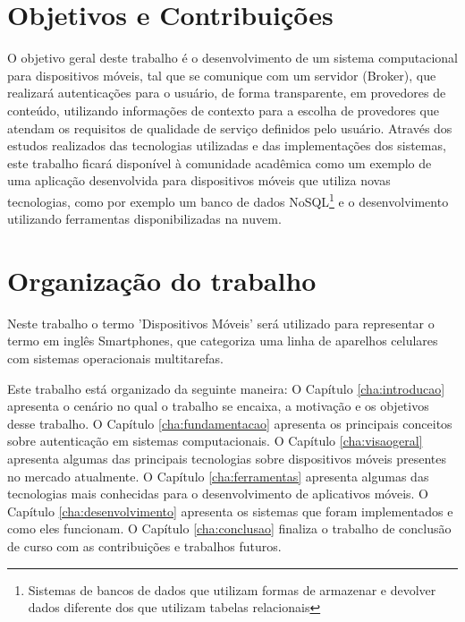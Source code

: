 \section{Objetivos e Contribuições}
O objetivo geral deste trabalho é o desenvolvimento de um sistema computacional para dispositivos móveis, tal que se comunique com um servidor (Broker), que realizará autenticações para o usuário, de forma transparente, em provedores de conteúdo, utilizando informações de contexto para a escolha de provedores que atendam os requisitos de qualidade de serviço definidos pelo usuário.
Através dos estudos realizados das tecnologias utilizadas e das implementações dos sistemas, este trabalho ficará disponível à comunidade acadêmica como um exemplo de uma aplicação desenvolvida para dispositivos móveis que utiliza novas tecnologias, como por exemplo um banco de dados NoSQL\footnote{Sistemas de bancos de dados que utilizam formas de armazenar e devolver dados diferente dos que utilizam tabelas relacionais} e o desenvolvimento utilizando ferramentas disponibilizadas na nuvem.

\section{Organização do trabalho}
Neste trabalho o termo 'Dispositivos Móveis' será utilizado para representar o termo em inglês Smartphones, que categoriza uma linha de aparelhos celulares com sistemas operacionais multitarefas.

Este trabalho está organizado da seguinte maneira: O Capítulo \ref{cha:introducao} apresenta o cenário no qual o trabalho se encaixa, a motivação e os objetivos desse trabalho. O Capítulo \ref{cha:fundamentacao} apresenta os principais conceitos sobre autenticação em sistemas computacionais. O Capítulo \ref{cha:visaogeral} apresenta algumas das principais tecnologias sobre dispositivos móveis presentes no mercado atualmente. O Capítulo \ref{cha:ferramentas} apresenta algumas das tecnologias mais conhecidas para o desenvolvimento de aplicativos móveis. O Capítulo \ref{cha:desenvolvimento} apresenta os sistemas que foram implementados e como eles funcionam. O Capítulo \ref{cha:conclusao} finaliza o trabalho de conclusão de curso com as contribuições e trabalhos futuros.